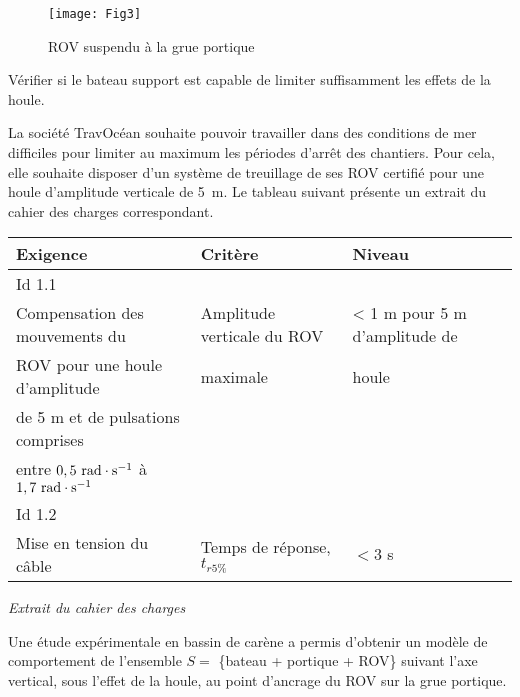 \begin{multicols}{2}
\ifprof
\else
\begin{figure}[H]
\centering
\texttt{[image: Fig3]}
\caption{ROV suspendu à la grue portique}
\label{Fig3}
\end{figure}
\fi



\begin{obj}
Vérifier si le bateau support est capable de limiter suffisamment les effets de la houle.
\end{obj}


\ifprof
\else
La société TravOcéan souhaite pouvoir travailler dans des conditions de mer difficiles pour limiter au maximum
les périodes d’arrêt des chantiers. Pour cela, elle souhaite disposer d’un système de treuillage de ses ROV
certifié pour une houle d’amplitude verticale de \SI{5}{m}. Le tableau suivant 
présente un extrait du cahier des charges correspondant.

\footnotesize
\begin{center}
\begin{tabular}{|p{3cm}|p{2cm}|p{2cm}|}
\hline
\textbf{Exigence} &\textbf{Critère}& \textbf{Niveau}\\
\hline
\hline
Id 1.1&&\\
Compensation des mouvements du&Amplitude verticale du ROV&< 1 m pour 5 m d’amplitude de\\
ROV pour une houle d’amplitude&maximale&houle\\
de 5 m et de pulsations comprises&&\\
entre $0,5 \ \text{rad}\cdot \text s^{-1}$ à $1,7 \ \text{rad}\cdot \text s^{-1}$&&\\
\hline
Id 1.2&&\\
Mise en tension du câble &Temps de réponse, $t_{r5\%}$ & $< 3$ s \\
\hline
\end{tabular}

\textit{Extrait du cahier des charges}
\label{tab1}
\end{center}

\normalsize


Une étude expérimentale en bassin de carène a permis d’obtenir un modèle de comportement de l’ensemble
$S =$ \{bateau + portique + ROV\} suivant l’axe vertical, sous l’effet de la houle, au point d’ancrage du ROV sur
la grue portique.\\


\end{multicols}
